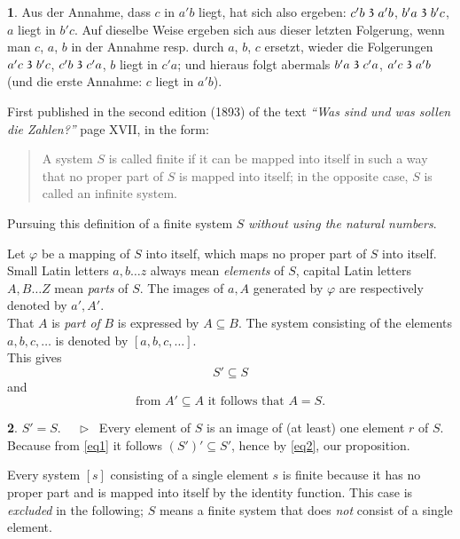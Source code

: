 \documentclass[leqno,hidelinks,10pt]{article}
\theoremstyle{definition}
\newtheorem{satz}{\protect\satzname}
\newcommand{\satzname}{}
\renewcommand{\satzname}{\hspace{-4pt}.\ Satz}%
\renewcommand{\satzname}{\hspace{-4pt}.\ Theorem}%
\newcommand\Beweis{\medskip \newline $ \phantom{'.'} \rhd \ $}%
\newcommand\TeilVon{\mathrel{\raisebox{0.45ex}{$\mathfrak{3}$}}}
\newcommand{\partof}{\subseteq}
\begin{document}
\begin{paracol}{2}
\begin{leftcolumn}
\begin{satz}
Aus der Annahme, dass $c$ in $a'b$ liegt, hat sich also ergeben: $c'b \TeilVon a'b$,
$b'a \TeilVon b'c$, $a$ liegt in $b'c$. Auf dieselbe Weise ergeben sich aus
dieser letzten Folgerung, wenn man $c$, $a$, $b$ in der Annahme resp. durch $a$,
$b$, $c$ ersetzt, wieder die Folgerungen $a'c \TeilVon b'c$, $c'b \TeilVon c'a$,
$b$ liegt in $c'a$; und hieraus folgt abermals $b'a \TeilVon c'a$,
$a'c \TeilVon a'b$ (und die erste Annahme: $c$ liegt in $a'b$).
\end{satz}
\newpage
\end{leftcolumn}


\begin{rightcolumn}

{}


\noindent First published in the second edition (1893) of the text
\textit{``Was sind und was sollen die Zahlen?''} page XVII, in the form:%

\begin{quote}
A system $S$ is called finite if it can be mapped into itself in such a way that
no proper part of $S$ is mapped into itself; in the opposite case, $S$ is called
an infinite system.
\end{quote}

Pursuing this definition of a finite system $S$ \emph{without using the natural numbers}.

Let $\varphi$ be a mapping of $S$ into itself, which maps no proper part of $S$
into itself. Small Latin letters $a, b \ldots z$ always mean \emph{elements} of
$S$, capital Latin letters $A, B \ldots Z$ mean \emph{parts} of $S$. The images
of $a, A$ generated by $\varphi$ are respectively denoted by $a', A'$.
\ \\

That $A$ is \emph{part of} $B$ is expressed by $A \partof B$. The system consisting
of the elements $a, b, c, \ldots$ is denoted by $[a, b, c, \ldots]$.
\ \\

This gives
\begin{equation}\label{eq1}
				S' \partof S
\end{equation}
and %
\begin{equation}\label{eq2}
		\text{from } A' \partof A \text{ it follows that } A = S.
\end{equation}

\begin{satz}\label{thm1}$S' = S$.
\Beweis
Every element of $S$ is an image of (at least) one element $r$ of $S$. Because
from \eqref{eq1} it follows $(S')' \partof S'$, hence by \eqref{eq2}, our proposition.
\end{satz}
Every system $[s]$ consisting of a single element $s$ is finite because it has
no proper part and is mapped into itself by the identity function. This case is
\emph{excluded} in the following; $S$ means a finite system that does \emph{not}
consist of a single element.


\end{rightcolumn}
\end{paracol}
\end{document}
